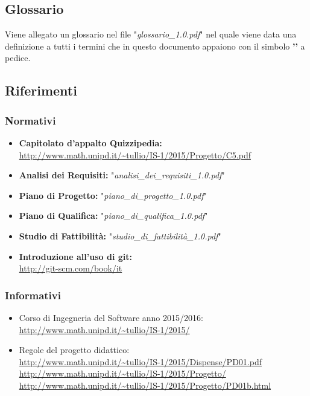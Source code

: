 \documentclass[a4paper,11pt]{article}
\begin{document}
		\subsection{Glossario}
			Viene allegato un glossario nel file "\textit{glossario\_1.0.pdf}" nel quale viene data una definizione a tutti i termini che in questo documento appaiono con il simbolo \textbf{'\addglos'}  a pedice.
		\subsection{Riferimenti}
			\subsubsection{Normativi}
				\begin{itemize}
					\item \textbf{Capitolato d'appalto Quizzipedia:}\\
					\url{http://www.math.unipd.it/~tullio/IS-1/2015/Progetto/C5.pdf}
					\item \textbf{Analisi dei Requisiti:} "\textit{analisi\_dei\_requisiti\_1.0.pdf}"
					\item \textbf{Piano di Progetto:} "\textit{piano\_di\_progetto\_1.0.pdf}"
					\item \textbf{Piano di Qualifica:} "\textit{piano\_di\_qualifica\_1.0.pdf}"
					\item \textbf{Studio di Fattibilità:} "\textit{studio\_di\_fattibilità\_1.0.pdf}"
					\item \textbf{Introduzione all'uso di git:} \\
					\url{http://git-scm.com/book/it} 
				\end{itemize}
			\subsubsection{Informativi}
				\begin{itemize}
					\item Corso di Ingegneria del Software anno 2015/2016:\\
					\url{http://www.math.unipd.it/~tullio/IS-1/2015/}
					\item Regole del progetto didattico:\\
					\url{http://www.math.unipd.it/~tullio/IS-1/2015/Dispense/PD01.pdf}
					\url{http://www.math.unipd.it/~tullio/IS-1/2015/Progetto/}\\
					\url{http://www.math.unipd.it/~tullio/IS-1/2015/Progetto/PD01b.html}
				\end{itemize}
	
\end{document}

